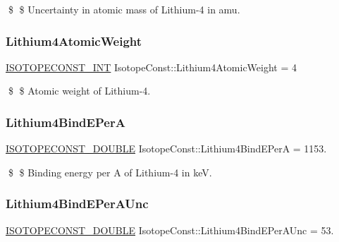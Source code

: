 \$ \$ Uncertainty in atomic mass of Lithium-\/4 in amu. \mbox{\label{group___isotope_const-_lithium-_li4_ga1bac4594a56b5af87ac2972f6905737e}} 
\subsubsection{\texorpdfstring{Lithium4\+Atomic\+Weight}{Lithium4AtomicWeight}}
{\footnotesize\ttfamily \mbox{\hyperlink{group___isotope_const-_macros_ga5f18360b3e99483a35c32d789e62621c}{I\+S\+O\+T\+O\+P\+E\+C\+O\+N\+S\+T\+\_\+\+I\+NT}} Isotope\+Const\+::\+Lithium4\+Atomic\+Weight = 4}

\$ \$ Atomic weight of Lithium-\/4. \mbox{\label{group___isotope_const-_lithium-_li4_ga201847920a9880f2ac2144fe833f993d}} 
\subsubsection{\texorpdfstring{Lithium4\+Bind\+E\+PerA}{Lithium4BindEPerA}}
{\footnotesize\ttfamily \mbox{\hyperlink{group___isotope_const-_macros_ga8f45a7272ce02c0b4c65c44636ed719a}{I\+S\+O\+T\+O\+P\+E\+C\+O\+N\+S\+T\+\_\+\+D\+O\+U\+B\+LE}} Isotope\+Const\+::\+Lithium4\+Bind\+E\+PerA = 1153.}

\$ \$ Binding energy per A of Lithium-\/4 in keV. \mbox{\label{group___isotope_const-_lithium-_li4_gaaf96bf0a9b53b8378afde55b647ccdc1}} 
\subsubsection{\texorpdfstring{Lithium4\+Bind\+E\+Per\+A\+Unc}{Lithium4BindEPerAUnc}}
{\footnotesize\ttfamily \mbox{\hyperlink{group___isotope_const-_macros_ga8f45a7272ce02c0b4c65c44636ed719a}{I\+S\+O\+T\+O\+P\+E\+C\+O\+N\+S\+T\+\_\+\+D\+O\+U\+B\+LE}} Isotope\+Const\+::\+Lithium4\+Bind\+E\+Per\+A\+Unc = 53.}

